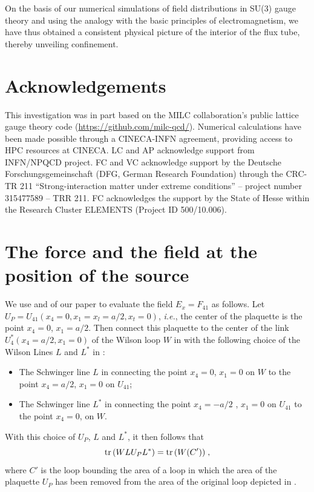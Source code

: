 \documentclass[pdftex,twocolumn,epjc3,envcountsect]{svjour3}
\DeclareMathOperator{\tr}{\rm tr\,}
\begin{document}
On the basis of our numerical simulations of field distributions in SU(3) gauge theory and using the analogy with the basic principles of electromagnetism, we have thus obtained a consistent physical picture of the interior of the flux tube, thereby unveiling confinement.


\section*{Acknowledgements}
This investigation was in part based on the MILC collaboration’s public lattice gauge theory code (\url{https://github.com/milc-qcd/}). Numerical calculations have been made possible through a CINECA-INFN agreement, providing access to HPC resources at CINECA. LC and AP acknowledge support from INFN/NPQCD project. FC and VC acknowledge support by the Deutsche Forschungsgemeinschaft (DFG, German Research Foundation) through the CRC-TR 211 ``Strong-interaction matter under extreme conditions'' -- project number 315477589 -- TRR 211. FC acknowledges the support by the State of Hesse within the Research Cluster ELEMENTS (Project ID 500/10.006).

\appendix

\section{The force and the field at the position of the source}
\label{sec:source}

We use  and  of our paper to evaluate the field $E_x = F_{41}$ as follows.
Let $U_P = U_{41} (x_4=0,  x_1=x_l=a/2, x_t=0)$, {\em i.e.}, the center of the plaquette is the point $x_4 = 0$,  $x_1 = a/2$.
Then connect this plaquette to the center of the link $U_4^* (x_4=a/2,  x_1=0)$ of the Wilson loop $W$ in  with the 
following choice of the Wilson Lines $L$ and $L^*$ in :
\begin{itemize}
    \item[$\bullet$] The Schwinger line $L$ in  connecting the point $x_4=0$,  $x_1=0$ on $W$ to the point $x_4=a/2$,  $x_1=0$  on $U_{41}$;
    \item[$\bullet$] The Schwinger line $L^*$ in  connecting the point $x_4=-a/2$ ,  $x_1=0$ on $U_{41}$ to the point $x_4 = 0$, on $W$.
\end{itemize}
With this choice of $U_P$,  $L$ and $L^*$, it then follows that
\begin{equation}
\tr (W L U_P L^*)  = \tr( W(C') )\;,
\label{eq:A1}
\end{equation}
where $C'$ is the loop bounding the area of a loop in which the area of the plaquette $U_P$ has been removed from the area of the original loop depicted in .
\end{document}
